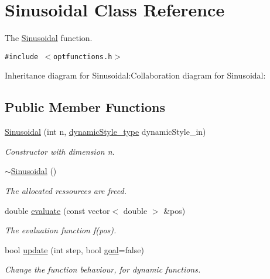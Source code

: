 \hypertarget{classSinusoidal}{
\section{Sinusoidal Class Reference}
\label{classSinusoidal}
}
The \hyperlink{classSinusoidal}{Sinusoidal} function.  


{\tt \#include $<$optfunctions.h$>$}

Inheritance diagram for Sinusoidal:Collaboration diagram for Sinusoidal:\subsection*{Public Member Functions}
\begin{CompactItemize}
\item 
\hyperlink{classSinusoidal_1b6ef5c12c0aba15f4a178b388ccd836}{Sinusoidal} (int n, \hyperlink{optfunctions_8h_ae9aa3a5dd199a43e77abc2cccf4477e}{dynamicStyle\_\-type} dynamicStyle\_\-in)
\begin{CompactList}\small\item\em Constructor with dimension n. \item\end{CompactList}\item 
\hyperlink{classSinusoidal_37f06e31c420a07fce3ee0b7737b40f1}{$\sim$Sinusoidal} ()
\begin{CompactList}\small\item\em The allocated ressources are freed. \item\end{CompactList}\item 
double \hyperlink{classSinusoidal_ebf69635314532d341503d97b09e7c39}{evaluate} (const vector$<$ double $>$ \&pos)
\begin{CompactList}\small\item\em The evaluation function f(pos). \item\end{CompactList}\item 
bool \hyperlink{classSinusoidal_c3015c343f9854389f85fe441b838f17}{update} (int step, bool \hyperlink{classFunction_d9eec4e429707542493d16d83fcb7f54}{goal}=false)
\begin{CompactList}\small\item\em Change the function behaviour, for dynamic functions. \item\end{CompactList}\end{CompactItemize}


